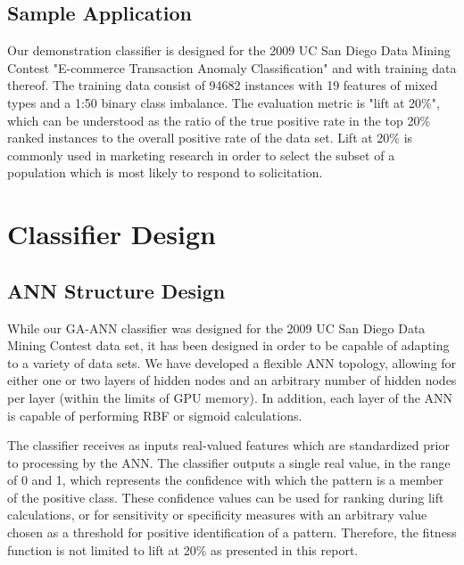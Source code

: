 \documentclass[letterpaper]{jpconf}       %
\begin{document}
\subsection{Sample Application} \label{contest}
Our demonstration classifier is designed for the 2009 UC San Diego Data Mining Contest "E-commerce Transaction Anomaly Classification" \cite{UCSG-Contest} and with training data thereof. The training data consist of 94682 instances with 19 features of mixed types and a 1:50 binary class imbalance. The evaluation metric is "lift at 20\%", which can be understood as the ratio of the true positive rate in the top 20\% ranked instances to the overall positive rate of the data set.  Lift at 20\% is commonly used in marketing research in order to select the subset of a population which is most likely to respond to solicitation.

\section{Classifier Design} \label{design}

\subsection{ANN Structure Design} \label{ann}

While our GA-ANN classifier was designed for the 2009 UC San Diego Data Mining Contest data set, it has been designed in order to be capable of adapting to a variety of data sets.  We have developed a flexible ANN topology, allowing for either one or two layers of hidden nodes and an arbitrary number of hidden nodes per layer (within the limits of GPU memory). In addition, each layer of the ANN is capable of performing RBF or sigmoid calculations.

The classifier receives as inputs real-valued features which are standardized prior to processing by the ANN.  The classifier outputs a single real value, in the range of 0 and 1, which represents the confidence with which the pattern is a member of the positive class.  These confidence values can be used for ranking during lift calculations, or for sensitivity or specificity measures with an arbitrary value chosen as a threshold for positive identification of a pattern.  Therefore, the fitness function is not limited to lift at 20\% as presented in this report.
\end{document}
